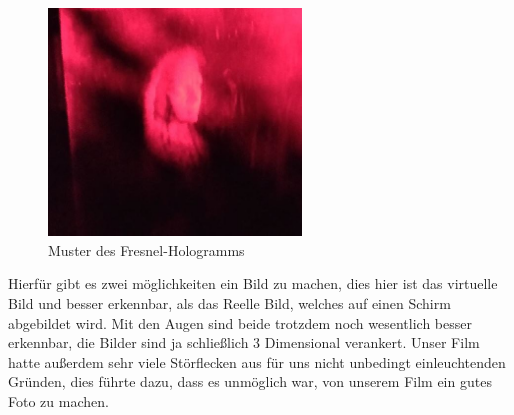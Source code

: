 \begin{figure}[htb]
   \centering
   \includegraphics[width=0.6\textwidth]{Abb/Abb_21.JPG} 
   \caption{Muster des Fresnel-Hologramms}
\end{figure}

Hierfür gibt es zwei möglichkeiten ein Bild zu machen, dies hier ist das virtuelle Bild und besser erkennbar, als das Reelle Bild, welches auf einen Schirm abgebildet wird. Mit den Augen sind beide trotzdem noch wesentlich besser erkennbar, die Bilder sind ja schließlich 3 Dimensional verankert.
Unser Film hatte außerdem sehr viele Störflecken aus für uns nicht unbedingt einleuchtenden Gründen, dies führte dazu, dass es unmöglich war, von unserem Film ein gutes Foto zu machen.

